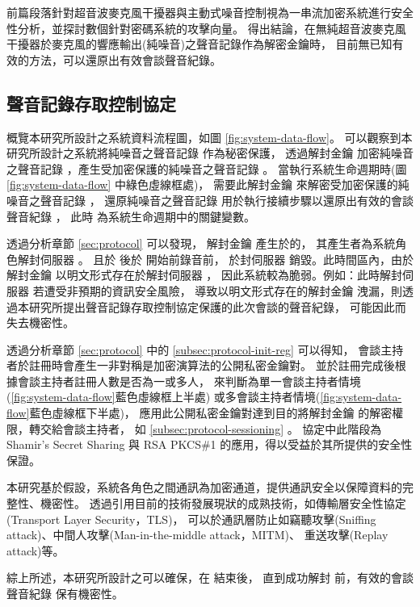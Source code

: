     前篇段落針對超音波麥克風干擾器與主動式噪音控制視為一串流加密系統進行安全性分析，並探討數個針對密碼系統的攻擊向量。
得出結論，在無純超音波麥克風干擾器於麥克風的響應輸出(純噪音)之聲音記錄作為解密金鑰時，
目前無已知有效的方法，可以還原出有效會談聲音紀錄。

\subsection{聲音記錄存取控制協定}

    概覽本研究所設計之系統資料流程圖，如圖 \ref{fig:system-data-flow}。
可以觀察到本研究所設計之系統將純噪音之聲音記錄 \DEFrecN 作為秘密保護，
透過解封金鑰 \DEFunsealKey 加密純噪音之聲音記錄 \DEFrecN，產生受加密保護的純噪音之聲音記錄 \DEFrecP。
當執行系統生命週期時(圖 \ref{fig:system-data-flow} 中綠色虛線框處)，
需要此解封金鑰 \DEFunsealKey 來解密受加密保護的純噪音之聲音記錄 \DEFrecP，
還原純噪音之聲音記錄 \DEFrecN 用於執行接續步驟以還原出有效的會談聲音紀錄 \DEFrecREV，
此時 \DEFunsealKey 為系統生命週期中的關鍵變數。

    透過分析章節 \ref{sec:protocol} 可以發現，
解封金鑰 \DEFunsealKey 產生於的，
其產生者為系統角色解封伺服器 \DEFserver。
且於  後於  開始前錄音前，
於封伺服器 \DEFserver 銷毀。此時間區內，由於解封金鑰 \DEFunsealKey 以明文形式存在於解封伺服器 \DEFserver，
因此系統較為脆弱。例如：此時解封伺服器 \DEFserver 若遭受非預期的資訊安全風險，
導致以明文形式存在的解封金鑰 \DEFunsealKey 洩漏，則透過本研究所提出聲音記錄存取控制協定保護的此次會談的聲音紀錄，
可能因此而失去機密性。

    透過分析章節 \ref{sec:protocol} 
中的 \ref{subsec:protocol-init-reg} 可以得知，
會談主持者於註冊時會產生一非對稱是加密演算法的公開私密金鑰對。
並於註冊完成後根據會談主持者註冊人數是否為一或多人，
來判斷為單一會談主持者情境(\ref{fig:system-data-flow}藍色虛線框上半處)
或多會談主持者情境(\ref{fig:system-data-flow}藍色虛線框下半處)，
應用此公開私密金鑰對達到目的將解封金鑰 \DEFunsealKey 的解密權限，轉交給會談主持者，
如 \ref{subsec:protocol-sessioning} 。
協定中此階段為 Shamir's Secret Sharing \cite{shamir1979share} 與
RSA PKCS\#1 \cite{rfc8017} 的應用，得以受益於其所提供的安全性保證。

    本研究基於假設，系統各角色之間通訊為加密通道，提供通訊安全以保障資料的完整性、機密性。
透過引用目前的技術發展現狀的成熟技術，如傳輸層安全性協定(Transport Layer Security，TLS)，
可以於通訊層防止如竊聽攻擊(Sniffing attack)、中間人攻擊(Man-in-the-middle attack，MITM)、
重送攻擊(Replay attack)等\cite{rfc5246}\cite{rfc8446}。

    綜上所述，本研究所設計之可以確保，在  結束後，
直到成功解封  前，有效的會談聲音紀錄 \DEFrecREV 保有機密性。
